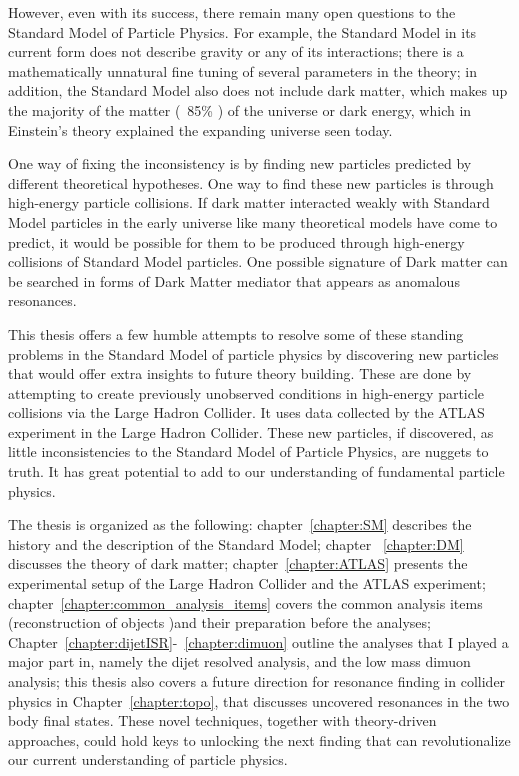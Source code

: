 However, even with its success, there remain many open questions to the Standard Model of Particle Physics. %
For example, the Standard Model in its current form does not describe gravity or any of its interactions; there is a mathematically unnatural fine tuning of several parameters in the theory; in addition, the
Standard Model also does not include dark matter, which makes up the majority of the matter (~85\% ) of the universe or dark energy, which in 
Einstein's theory explained the expanding universe seen today.  

One way of fixing the inconsistency is by finding new particles predicted by different theoretical hypotheses. One way to find these new particles  is through high-energy particle collisions. If dark matter interacted weakly with Standard Model particles in the early universe like many theoretical models have come to predict, it would be possible for them to be produced through high-energy collisions of Standard Model particles. One possible signature of Dark matter can be searched in forms of Dark Matter mediator that appears as anomalous resonances.

This thesis offers a few humble attempts to resolve some of these standing problems in the Standard Model of particle physics by discovering new particles that would offer extra insights to future theory building. These are done by attempting to create previously unobserved conditions in high-energy particle collisions via the Large Hadron Collider. It uses data collected by the ATLAS experiment in the Large Hadron Collider. These new particles, if discovered, as little inconsistencies to the Standard Model of Particle
Physics, are nuggets to truth. It has great potential to add to our understanding of fundamental particle physics.

The thesis is organized as the following: chapter~\ref{chapter:SM} describes the history and the description of the Standard Model; chapter ~\ref{chapter:DM} discusses the theory of dark matter; chapter~\ref{chapter:ATLAS} presents the experimental setup of the Large Hadron Collider and the ATLAS experiment;
chapter~\ref{chapter:common_analysis_items} covers the common analysis items (reconstruction
of objects )and their preparation before the analyses; Chapter~\ref{chapter:dijetISR}-~\ref{chapter:dimuon} outline the analyses that I played a major part in, namely the dijet resolved analysis, and the low mass dimuon analysis; this thesis also covers a future direction for resonance finding in collider physics in Chapter~\ref{chapter:topo}, that discusses uncovered resonances in the two body final states. These novel techniques, together with theory-driven approaches, could hold keys to unlocking the next finding that can revolutionalize our current understanding of particle physics. 

